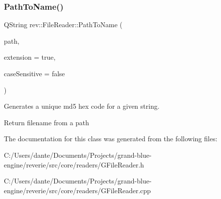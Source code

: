\subsubsection{\texorpdfstring{PathToName()}{PathToName()}}
{\footnotesize\ttfamily Q\+String rev\+::\+File\+Reader\+::\+Path\+To\+Name (\begin{DoxyParamCaption}\item[{const Q\+String \&}]{path,  }\item[{bool}]{extension = {\ttfamily true},  }\item[{bool}]{case\+Sensitive = {\ttfamily false} }\end{DoxyParamCaption})\hspace{0.3cm}{\ttfamily [static]}}



Generates a unique md5 hex code for a given string. 

Return filename from a path 

The documentation for this class was generated from the following files\+:\begin{DoxyCompactItemize}
\item 
C\+:/\+Users/dante/\+Documents/\+Projects/grand-\/blue-\/engine/reverie/src/core/readers/G\+File\+Reader.\+h\item 
C\+:/\+Users/dante/\+Documents/\+Projects/grand-\/blue-\/engine/reverie/src/core/readers/G\+File\+Reader.\+cpp\end{DoxyCompactItemize}
